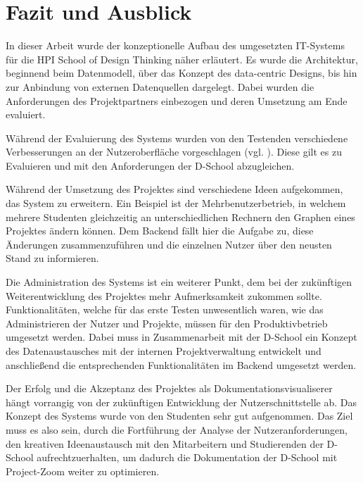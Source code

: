 \chapter{Fazit und Ausblick}
In dieser Arbeit wurde der konzeptionelle Aufbau des umgesetzten IT-Systems für die HPI School of Design Thinking näher erläutert. Es wurde die Architektur, beginnend beim Datenmodell, über das Konzept des data-centric Designs, bis hin zur Anbindung von externen Datenquellen dargelegt. Dabei wurden die Anforderungen des Projektpartners einbezogen und deren Umsetzung am Ende evaluiert.

Während der Evaluierung des Systems wurden von den Testenden verschiedene Verbesserungen an der Nutzeroberfläche vorgeschlagen (vgl. \cite{bp-tomh}). Diese gilt es zu Evaluieren und mit den Anforderungen der D-School abzugleichen.

Während der Umsetzung des Projektes sind verschiedene Ideen aufgekommen, das System zu erweitern. Ein Beispiel ist der Mehrbenutzerbetrieb, in welchem mehrere Studenten gleichzeitig an unterschiedlichen Rechnern den Graphen eines Projektes ändern können. Dem Backend fällt hier die Aufgabe zu, diese Änderungen zusammenzuführen und die einzelnen Nutzer über den neusten Stand zu informieren.

Die Administration des Systems ist ein weiterer Punkt, dem bei der zukünftigen Weiterentwicklung des Projektes mehr Aufmerksamkeit zukommen sollte. Funktionalitäten, welche für das erste Testen unwesentlich waren, wie das Administrieren der Nutzer und Projekte, müssen für den Produktivbetrieb umgesetzt werden. Dabei muss in Zusammenarbeit mit der D-School ein Konzept des Datenaustausches mit der internen Projektverwaltung entwickelt und anschließend die entsprechenden Funktionalitäten im Backend umgesetzt werden.

Der Erfolg und die Akzeptanz des Projektes als Dokumentationsvisualiserer hängt vorrangig von der zukünftigen Entwicklung der Nutzerschnittstelle ab. Das Konzept des Systems wurde von den Studenten sehr gut aufgenommen. Das Ziel muss es also sein, durch die Fortführung der Analyse der Nutzeranforderungen, den kreativen Ideenaustausch mit den Mitarbeitern und Studierenden der D-School aufrechtzuerhalten, um dadurch die Dokumentation der D-School mit Project-Zoom weiter zu optimieren.